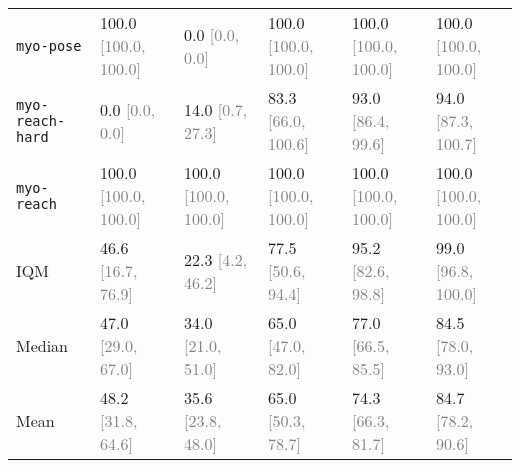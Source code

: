 \begin{table}[h]
{{\begin{tabular}{llllll}
\texttt{myo-pose} & 100.0 \textcolor{gray}{[100.0, 100.0]} & 0.0 \textcolor{gray}{[0.0, 0.0]} & 100.0 \textcolor{gray}{[100.0, 100.0]} & 100.0 \textcolor{gray}{[100.0, 100.0]} & 100.0 \textcolor{gray}{[100.0, 100.0]} \\
\texttt{myo-reach-hard} & 0.0 \textcolor{gray}{[0.0, 0.0]} & 14.0 \textcolor{gray}{[0.7, 27.3]} & 83.3 \textcolor{gray}{[66.0, 100.6]} & 93.0 \textcolor{gray}{[86.4, 99.6]} & 94.0 \textcolor{gray}{[87.3, 100.7]} \\
\texttt{myo-reach} & 100.0 \textcolor{gray}{[100.0, 100.0]} & 100.0 \textcolor{gray}{[100.0, 100.0]} & 100.0 \textcolor{gray}{[100.0, 100.0]} & 100.0 \textcolor{gray}{[100.0, 100.0]} & 100.0 \textcolor{gray}{[100.0, 100.0]} \\ \midrule
IQM & 46.6 \textcolor{gray}{[16.7, 76.9]} & 22.3 \textcolor{gray}{[4.2, 46.2]} & 77.5 \textcolor{gray}{[50.6, 94.4]} & 95.2 \textcolor{gray}{[82.6, 98.8]} & 99.0 \textcolor{gray}{[96.8, 100.0]} \\
Median & 47.0 \textcolor{gray}{[29.0, 67.0]} & 34.0 \textcolor{gray}{[21.0, 51.0]} & 65.0 \textcolor{gray}{[47.0, 82.0]} & 77.0 \textcolor{gray}{[66.5, 85.5]} & 84.5 \textcolor{gray}{[78.0, 93.0]} \\
Mean & 48.2 \textcolor{gray}{[31.8, 64.6]} & 35.6 \textcolor{gray}{[23.8, 48.0]} & 65.0 \textcolor{gray}{[50.3, 78.7]} & 74.3 \textcolor{gray}{[66.3, 81.7]} & 84.7 \textcolor{gray}{[78.2, 90.6]} \\
\bottomrule
\end{tabular}
}
}
\vspace{-0.1in}
\end{table}
